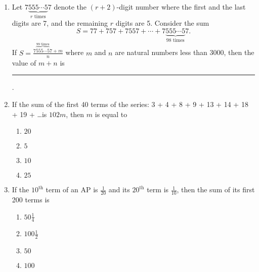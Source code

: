 \begin{enumerate}    [label=\thesubsection.\arabic*, ref=\thesubsection.\theenumi]
\begin{enumerate}		
\item     $(I)\to(T);(II)\to(C);(III)\to(D);(IV)\to(T)$
\item     $(I)\to(B);(II)\to(D);(III)\to(D);(IV)\to(C)$   
\item     $(I)\to(B);(II)\to(C);(III)\to(A);(IV)\to(C)$
\item     $(I)\to(T);(II)\to(D);(III)\to(A);(IV)\to(T)$
\end{enumerate}
\item  Let $ {7\underbrace{555\cdots5}_{r \text{ times}}7} $ denote the \( (r+2) \)-digit number where the first and the last digits are 7, and the remaining \( r \) digits are 5. Consider the sum $$S =77 + 757 + 7557 + \cdots + 7\underbrace{555\cdots5}_{98 \text{ times}}7.$$ If $ S = \frac{7\overbrace{555\cdots5}^{99 \text{ times}}7+m}{n} $ where \( m \) and \( n \) are natural numbers less than 3000, then the value of \( m + n \) is \rule{1cm}{0.1pt}.
	\hfill {}
\item If the sum of the first 40 terms of the series: 3 + 4 + 8 + 9 + 13 + 14 + 18 + 19 + \dots is $102m$, then $m$ is equal to
	\hfill {}
		\begin{multicols}{4}
\begin{enumerate}
   \item $20$
   \item $5$
   \item $10$
   \item $25$
\end{enumerate}
                                         \end{multicols} 
					 \item If the $10^{\text{th}}$ term of an  AP  is $\frac{1}{20}$ and its $20^{\text{th}}$ term is $\frac{1}{10}$, then the sum of its first 200 terms is
	\hfill {}
		\begin{multicols}{4}
\begin{enumerate}
    \item $50 \frac{1}{4}$
    \item $100 \frac{1}{2}$
    \item $50$
    \item $100$
\end{enumerate}
                                         \end{multicols} 
\end{enumerate}
